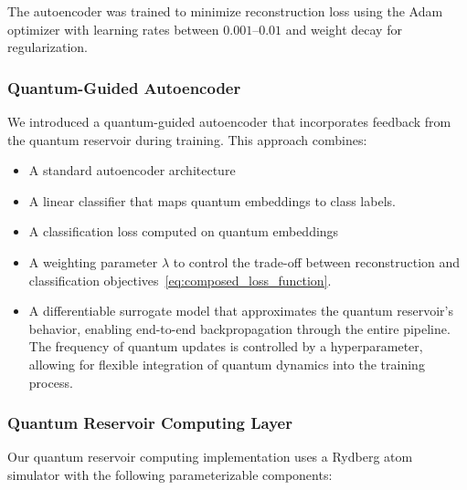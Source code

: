 \documentclass[conference]{IEEEtran}
\begin{document}
The autoencoder was trained to minimize reconstruction 
loss using the Adam optimizer with learning rates 
between $0.001$--$0.01$ and weight decay for regularization.

\subsubsection{Quantum-Guided Autoencoder}
We introduced a quantum-guided autoencoder 
that incorporates feedback from the quantum 
reservoir during training. This approach combines:

\begin{itemize}
    \item A standard autoencoder architecture
    \item A linear classifier that maps quantum embeddings to class labels.
    \item A classification loss computed on quantum embeddings
    \item A weighting parameter $\lambda$ to control the trade-off between 
    reconstruction and classification objectives~\ref{eq:composed_loss_function}.
    \item A differentiable surrogate model that approximates the quantum reservoir's behavior,
    enabling end-to-end backpropagation through the entire pipeline. The frequency 
    of quantum updates is controlled by a hyperparameter, allowing for
    flexible integration of quantum dynamics into the training process.
\end{itemize}


\subsubsection{Quantum Reservoir Computing Layer}
Our quantum reservoir computing implementation uses 
a Rydberg atom simulator with the following parameterizable
components:
\end{document}
